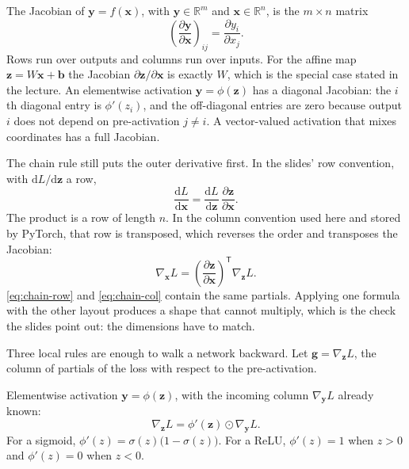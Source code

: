 \documentclass[11pt]{article}
\newcommand{\R}{\mathbb{R}}
\begin{document}
The Jacobian of $\mathbf{y}=f(\mathbf{x})$, with $\mathbf{y}\in\R^m$ and $\mathbf{x}\in\R^n$, is the $m\times n$ matrix
\begin{equation}
\left(\frac{\partial\mathbf{y}}{\partial\mathbf{x}}\right)_{ij}
=
\frac{\partial y_i}{\partial x_j}.
\end{equation}
Rows run over outputs and columns run over inputs. For the affine map $\mathbf{z}=W\mathbf{x}+\mathbf{b}$ the Jacobian $\partial\mathbf{z}/\partial\mathbf{x}$ is exactly $W$, which is the special case stated in the lecture. An elementwise activation $\mathbf{y}=\phi(\mathbf{z})$ has a diagonal Jacobian: the $i$th diagonal entry is $\phi'(z_i)$, and the off-diagonal entries are zero because output $i$ does not depend on pre-activation $j\neq i$. A vector-valued activation that mixes coordinates has a full Jacobian.

The chain rule still puts the outer derivative first. In the slides' row convention, with $\mathrm{d}L/\mathrm{d}\mathbf{z}$ a row,
\begin{equation}
\frac{\mathrm{d}L}{\mathrm{d}\mathbf{x}}
=
\frac{\mathrm{d}L}{\mathrm{d}\mathbf{z}}\,
\frac{\partial\mathbf{z}}{\partial\mathbf{x}}.
\label{eq:chain-row}
\end{equation}
The product is a row of length $n$. In the column convention used here and stored by PyTorch, that row is transposed, which reverses the order and transposes the Jacobian:
\begin{equation}
\nabla_{\mathbf{x}}L
=
\left(\frac{\partial\mathbf{z}}{\partial\mathbf{x}}\right)^{\mathsf T}
\nabla_{\mathbf{z}}L.
\label{eq:chain-col}
\end{equation}
\eqref{eq:chain-row} and \eqref{eq:chain-col} contain the same partials. Applying one formula with the other layout produces a shape that cannot multiply, which is the check the slides point out: the dimensions have to match.

Three local rules are enough to walk a network backward. Let $\mathbf{g}=\nabla_{\mathbf{z}}L$, the column of partials of the loss with respect to the pre-activation.

Elementwise activation $\mathbf{y}=\phi(\mathbf{z})$, with the incoming column $\nabla_{\mathbf{y}}L$ already known:
\begin{equation}
\nabla_{\mathbf{z}}L
=
\phi'(\mathbf{z})\odot\nabla_{\mathbf{y}}L.
\end{equation}
For a sigmoid, $\phi'(z)=\sigma(z)\bigl(1-\sigma(z)\bigr)$. For a ReLU, $\phi'(z)=1$ when $z>0$ and $\phi'(z)=0$ when $z<0$.
\end{document}
